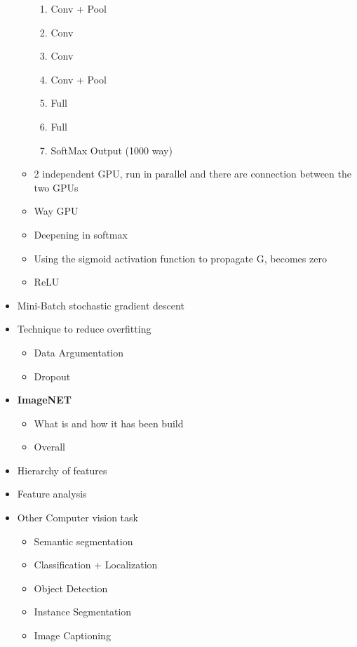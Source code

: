 \documentclass[12pt,oneside]{report}
\begin{document}
\begin{itemize}
\begin{itemize}
\begin{enumerate}
            \item Conv + Pool
            \item Conv
            \item Conv
            \item Conv + Pool
            \item Full
            \item Full
            \item SoftMax Output (1000 way)
        \end{enumerate}
        \item 2 independent GPU, run in parallel and there are connection between the two GPUs
        \item Way GPU
        \item Deepening in softmax
        \item Using the sigmoid activation function to propagate G, becomes zero
        \item ReLU
    \end{itemize}
    \item Mini-Batch stochastic gradient descent
    \item Technique to reduce overfitting
    \begin{itemize}
        \item Data Argumentation
        \item Dropout
    \end{itemize}
    \item \textbf{ImageNET}
    \begin{itemize}
        \item What is and how it has been build
        \item Overall
    \end{itemize}
    \item Hierarchy of features
    \item Feature analysis
    \item Other Computer vision task
    \begin{itemize}
        \item Semantic segmentation
        \item Classification + Localization
        \item Object Detection
        \item Instance Segmentation
        \item Image Captioning
    \end{itemize}
\end{itemize}
\end{document}
